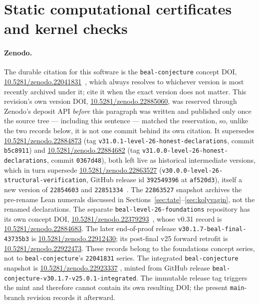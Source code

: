 \section{Static computational certificates and kernel checks}\label{sec:comp}

\paragraph{Zenodo.}
The durable citation for this software is the \texttt{beal-conjecture}
concept DOI,
\href{https://doi.org/10.5281/zenodo.22041831}{10.5281/zenodo.22041831}~\cite{zenodo-concept},
which always resolves to whichever version is most recently archived
under it; cite it when the exact version does not matter. This
revision's own version DOI,
\href{https://doi.org/10.5281/zenodo.22885060}{10.5281/zenodo.22885060},
was reserved through Zenodo's deposit API \emph{before} this paragraph
was written and published only once the source tree --- including this
sentence --- matched the reservation, so, unlike the two records
below, it is not one commit behind its own citation. It supersedes
\href{https://doi.org/10.5281/zenodo.22884873}{10.5281/zenodo.22884873}
(tag \texttt{v31.0.1-level-26-honest-declarations}, commit
\texttt{b5c8911}) and
\href{https://doi.org/10.5281/zenodo.22884682}{10.5281/zenodo.22884682}
(tag \texttt{v31.0.0-level-26-honest-declarations}, commit
\texttt{0367d48}), both left live as historical intermediate
versions, which in turn supersede
\href{https://doi.org/10.5281/zenodo.22863527}{10.5281/zenodo.22863527}
(\texttt{v30.0.0-level-26-structural-verification}, GitHub release id
\texttt{392549396} at \texttt{af520d3}), itself a new version of
\texttt{22854603} and \texttt{22851334}~\cite{zenodo-v31,zenodo-v30}.
The \texttt{22863527} snapshot archives the pre-rename Lean numerals
discussed in Sections~\ref{sec:tate}--\ref{sec:kolyvagin}, not the
renamed declarations. The separate \texttt{beal-level-26-foundations}
repository has its own concept DOI,
\href{https://doi.org/10.5281/zenodo.22379293}{10.5281/zenodo.22379293}~\cite{zenodo-concept-foundations},
whose v0.31 record is
\href{https://doi.org/10.5281/zenodo.22884683}{10.5281/zenodo.22884683}.
The later end-of-proof release
\texttt{v30.1.7-beal-final-43735b3} is
\href{https://doi.org/10.5281/zenodo.22912430}{10.5281/zenodo.22912430};
its post-final v25 forward retrofit is
\href{https://doi.org/10.5281/zenodo.22922473}{10.5281/zenodo.22922473}.
These records belong to the foundations concept series, not to
\texttt{beal-conjecture}'s \texttt{22041831} series.
The integrated \texttt{beal-conjecture} snapshot is
\href{https://doi.org/10.5281/zenodo.22923337}{10.5281/zenodo.22923337}
\cite{zenodo-integrated}, minted from GitHub release
\texttt{beal-conjecture-v30.1.7-v25.0.1-integrated}. The immutable release
tag triggers the mint and therefore cannot contain its own resulting DOI;
the present \texttt{main}-branch revision records it afterward.


